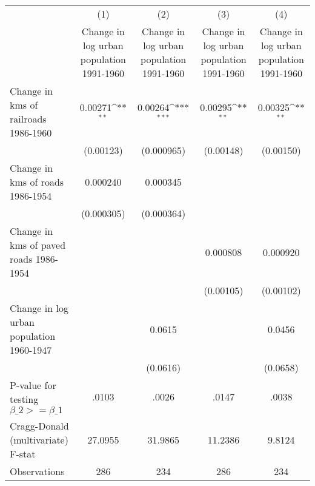 {
\def\sym#1{\ifmmode^{#1}\else\(^{#1}\)\fi}
\begin{tabular}{l*{4}{c}}
\hline\hline
                &\multicolumn{1}{c}{(1)}&\multicolumn{1}{c}{(2)}&\multicolumn{1}{c}{(3)}&\multicolumn{1}{c}{(4)}\\
                &\multicolumn{1}{c}{Change in log urban population 1991-1960}&\multicolumn{1}{c}{Change in log urban population 1991-1960}&\multicolumn{1}{c}{Change in log urban population 1991-1960}&\multicolumn{1}{c}{Change in log urban population 1991-1960}\\
\hline
Change in kms of railroads 1986-1960&  0.00271\sym{**} &  0.00264\sym{***}&  0.00295\sym{**} &  0.00325\sym{**} \\
                &(0.00123)         &(0.000965)         &(0.00148)         &(0.00150)         \\
[1em]
Change in kms of roads 1986-1954& 0.000240         & 0.000345         &                  &                  \\
                &(0.000305)         &(0.000364)         &                  &                  \\
[1em]
Change in kms of paved roads 1986-1954&                  &                  & 0.000808         & 0.000920         \\
                &                  &                  &(0.00105)         &(0.00102)         \\
[1em]
Change in log urban population 1960-1947&                  &   0.0615         &                  &   0.0456         \\
                &                  & (0.0616)         &                  & (0.0658)         \\
\hline
P-value for testing $\beta\_{2} >= \beta\_{1}$&    .0103         &    .0026         &    .0147         &    .0038         \\
Cragg-Donald (multivariate) F-stat&  27.0955         &  31.9865         &  11.2386         &   9.8124         \\
Observations    &      286         &      234         &      286         &      234         \\
\hline\hline
\end{tabular}
}
